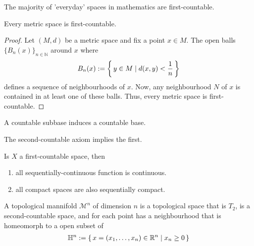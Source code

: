 \begin{rembox}
    \begin{remark}
        The majority of 'everyday' spaces in mathematics are first-countable.
    \end{remark}
\end{rembox}

\begin{exmbox}
    \begin{example}
        Every metric space is first-countable.
    \end{example}
\end{exmbox}

\begin{proof}
    Let \((M, d)\) be a metric space and fix a point \(x \in M\). The open balls \(\{B_n(x)\}_{n \in \mathbb{N}}\) around \(x\) where
    \begin{align*}
        B_n(x) := \left\{\, y \in M \mid d(x, y) < \frac{1}{n} \,\right\}
    \end{align*}
    defines a sequence of neighbourhoods of \(x\). Now, any neighbourhood \(N\) of \(x\) is contained in at least one of these balls. Thus, every metric space is first-countable.
\end{proof}

\begin{rembox}
    \begin{remark}
        A countable subbase induces a countable base.
    \end{remark}
\end{rembox}

\begin{thmbox}
    \begin{lemma}
        The second-countable axiom implies the first.
    \end{lemma}
\end{thmbox}

\begin{thmbox}
    \begin{lemma}
        Is \(X\) a first-countable space, then
        \begin{enumerate}
            \item all sequentially-continuous function is continuous.
            \item all compact spaces are also sequentially compact.
        \end{enumerate}
    \end{lemma}
\end{thmbox}

\begin{defbox}
    \begin{definition}
        A topological mannifold \(\mathcal{M}^n\) of dimension \(n\) is a topological space that is \(T_2\), is a second-countable space, and for each point has a neighbourhood that is homeomorph to a open subset of
        \begin{align*}
            \mathbb{H}^n := \left\{\, x = (x_1, \ldots, x_n) \in \mathbb{R}^n \mid x_n \geq 0 \,\right\}
        \end{align*}
    \end{definition}
\end{defbox}

